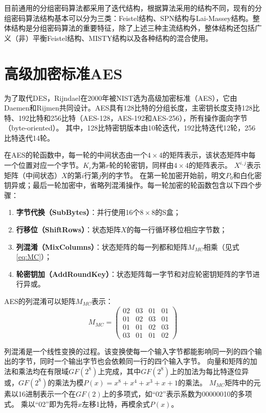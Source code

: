目前通用的分组密码算法都采用了迭代结构，根据算法采用的结构不同，现有的分组密码算法结构基本可以分为三类：Feistel结构、SPN结构与Lai-Massey结构。整体结构是分组密码算法的重要特征，除了上述三种主流结构外，整体结构还包括广义（非）平衡Feistel结构、MISTY结构以及各种结构的混合使用。

\section{高级加密标准AES}
为了取代DES，Rijndael在2000年被NIST选为高级加密标准（AES），它由Daemen和Rijmen共同设计。AES具有128比特的分组长度，主密钥长度支持128比特、192比特和256比特（AES-128，AES-192和AES-256），所有操作面向字节（byte-oriented）。
其中，128比特密钥版本由10轮迭代，192比特迭代12轮，256比特迭代14轮。

在AES的轮函数中，每一轮的中间状态由一个$4\times 4$的矩阵表示，该状态矩阵中每一个位置对应一个字节。$K_r$为第$r$轮的轮密钥，同样由$4\times 4$的矩阵表示。
$X^{i,j}$表示矩阵（中间状态）$X$的第$i$行第$j$列的字节。
在第一轮加密开始前，明文$P_0$和白化密钥异或；最后一轮加密中，省略列混淆操作。每一轮加密的轮函数包含以下四个步骤：
\begin{enumerate}
    \item \textbf{字节代换（SubBytes）}：并行使用16个$8\times 8$的S盒；
    \item \textbf{行移位（ShiftRows）}：状态矩阵$X$的每一行循环移位相应字节数；
    \item \textbf{列混淆（MixColumns）}：状态矩阵的每一列都和矩阵$M_{MC}$相乘（见式\ref{eq:MC}）；
    \item \textbf{轮密钥加（AddRoundKey）}：状态矩阵每一字节和对应轮密钥矩阵的字节进行异或。
\end{enumerate}

AES的列混淆可以矩阵$M_{MC}$表示：
\begin{equation}
    M_{MC}=\left(
    \begin{array}{cccc}
        02&03&01&01\\
        01&02&03&01\\
        01&01&02&03\\
        03&01&01&02
    \end{array}
\right)
\label{eq:MC}
\end{equation}

列混淆是一个线性变换的过程。该变换使每一个输入字节都能影响同一列的四个输出的字节，同时一个输出字节也会依赖同一行的四个输入字节。
向量和矩阵的加法和乘法均在有限域$GF(2^8)$上完成，其中$GF(2^8)$上的加法为每比特逐位异或，$GF(2^8)$的乘法为模$P(x)=x^8+x^4+x^3+x+1$的乘法。
$M_{MC}$矩阵中的元素以16进制表示一个在$GF(2)$上的多项式，如“02”表示系数为00000010的多项式。
乘以“02”即为先将$x$左移1比特，再模余式$P(x)$。 

